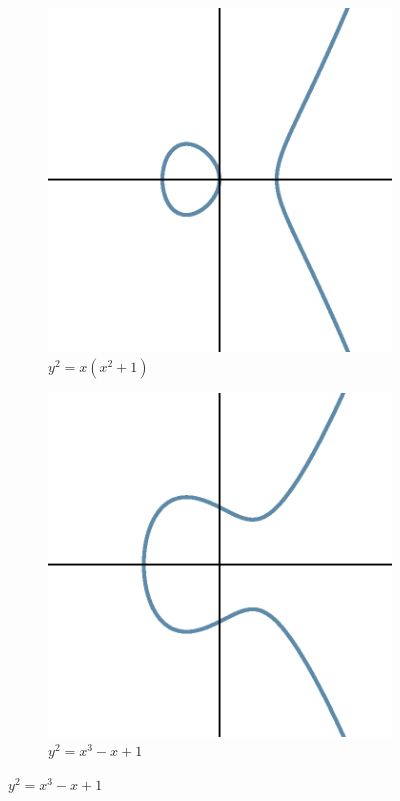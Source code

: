 \begin{frame}[plain]
	\begin{figure}[h]
	\centering
	\begin{subfigure}{0.45\textwidth}
	\includegraphics[width=\textwidth]{images/ec2.eps}
	\caption*{$y^2=x(x^2+1)$}
	\end{subfigure}
	\begin{subfigure}{0.45\textwidth}
	\includegraphics[width=\textwidth]{images/ec1.eps}
	\caption*{$y^2=x^3-x+1$}
	\end{subfigure}
	\end{figure}
\end{frame}



